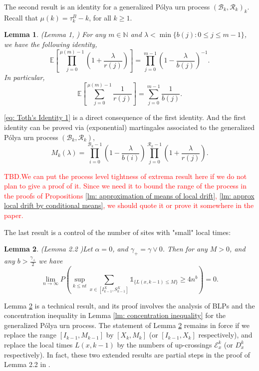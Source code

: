 \documentclass[twoside,12pt,a4paper]{article}
\newtheorem{lemma}{Lemma}[section]
\numberwithin{equation}{section}
\newcommand\TBD{\textcolor{red}{TBD.}}
\begin{document}
The second result is an identity for a generalized P\'{o}lya urn process $(\mathcal{B}_{k},\mathcal{R}_{k})_k$. Recall that $\mu(k)= \tau^B_k - k$, for all $k\geq 1$. 
\begin{lemma}(Lemma 1, \cite{T96}) \label{lm: Toth's Identity}
	For any $m\in \mathbb{N}$ and $\lambda < \min\{ b(j): 0\leq j\leq m-1 \}$, we have the following identity,
	$$  \mathbb{E}\left[  \prod_{j=0}^{ \mu(m)-1 } \left(1+ \frac{\lambda}{r(j)}   \right) \right] =   \prod_{j=0}^{ m-1 } \left(1- \frac{\lambda}{b(j)}   \right)^{-1}.   $$ 
	In particular, 
	\begin{equation}\label{eq: Toth's Identity 1}
		\mathbb{E}\left[  \sum_{j=0}^{ \mu(m)-1 } \frac{1}{r(j)}   \right] =   \sum_{j=0}^{ m-1 } \frac{1}{b(j)}.
	\end{equation}	
\end{lemma}
\eqref{eq: Toth's Identity 1} is a direct consequence of the first identity. And the first identity can be proved via (exponential) martingales associated to the generalized P\'{o}lya urn process $(\mathcal{B}_{k},\mathcal{R}_{k})$, 
$$M_k(\lambda) = \prod_{i=0}^{ \mathcal{B}_{k}-1 } \left(1-\frac{\lambda}{b(i)}\right) \prod_{j=0}^{\mathcal{R}_{k}-1 } \left(1+\frac{\lambda}{r(j)}\right). $$

\TBD \textcolor{red}{We can put the process level tightness of extrema result here if we do not plan to give a proof of it. Since we need it to bound the range of the process in the proofs of Propositions \ref{lm: approximation of means of local drift}, \ref{lm: approx local drift by conditional means}, we should quote it or prove it somewhere in the paper.}  

The last result is a control of the number of sites with "small" local times:
\begin{lemma}(Lemma 2.2 \cite{KMP22})\label{lm: number of rarely visit sites}
	Let $\alpha =0$, and $\gamma_+ = \gamma \vee 0$. Then for any $M>0$, and any $b>\frac{\gamma_+}{2}$ we have
	$$
	\lim_{n\to\infty} P\left(\sup_{k\leq nt}  \sum_{x\in [I^X_{k-1}, S^X_{k-1}]} \mathbb{1}_{\{ L(x,k-1) \leq M \}} \geq 4n^b \right) = 0.
	$$
	
\end{lemma}	
Lemma \ref{lm: number of rarely visit sites} is a technical result, and its proof involves the analysis of BLPs and the concentration inequality in Lemma \ref{lm: concentration inequality} for the generalized P\'{o}lya urn process. The statement of Lemma \ref{lm: number of rarely visit sites} remains in force if we replace the range $[I_{k-1}, M_{k-1}]$ by $[X_k,M_k]$ (or $[I_{k-1},X_k]$ respectively), and replace the local times $L(x,k-1)$ by the numbers of up-crossings $\mathcal{E}^{k}_x$ (or $D^{k}_x$ respectively). In fact, these two extended results are partial steps in the proof of Lemma 2.2 in \cite{KMP22}.   
\end{document}
